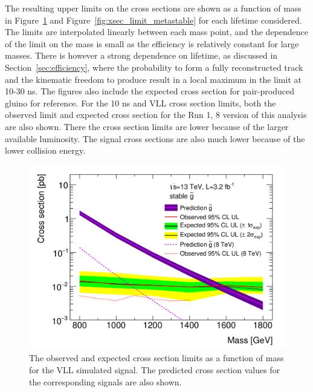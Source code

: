 The resulting upper limits on the cross sections are shown as a function of mass in Figure~\ref{fig:xsec_limit_stable} and Figure~\ref{fig:xsec_limit_metastable} for each lifetime considered.
The limits are interpolated linearly between each mass point, and the dependence of the limit on the mass is small as the efficiency is relatively constant for large \rhadron masses.
There is however a strong dependence on lifetime, as discussed in Section~\ref{sec:efficiency}, where the probability to form a fully reconstructed track and the kinematic freedom to produce \met result in a local maximum in the limit at 10-30 ns.
The figures also include the expected cross section for pair-produced gluino \rhadrons for reference.
For the 10 ns and \ac{VLL} cross section limits, both the observed limit and expected cross section for the Run 1, 8 \TeV version of this analysis are also shown.
There the cross section limits are lower because of the larger available luminosity. 
The signal cross sections are also much lower because of the lower collision energy.

\begin{figure}
\centering
\includegraphics[width=\fullfig]{figures/xsec_limit_stable.png}
\caption{The observed and expected cross section limits as a function of mass for the \ac{VLL} simulated signal. The predicted cross section values for the corresponding signals are also shown. }
\label{fig:xsec_limit_stable}
\end{figure}

